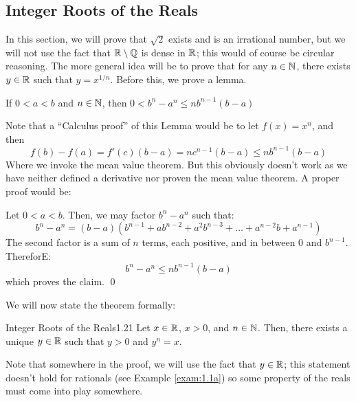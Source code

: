 \subsection{Integer Roots of the Reals}
In this section, we will prove that $\sqrt{2}$ exists and is an irrational number, but we will not use the fact that $\mathbb{R} \setminus \mathbb{Q}$ is dense in $\mathbb{R}$; this would of course be circular reasoning. The more general idea will be to prove that for any $n \in \mathbb{N}$, there exists $y \in \mathbb{R}$ such that $y = x^{1/n}$. Before this, we prove a lemma.
\begin{nlemma}{}
    If $0 < a < b$ and $n \in \mathbb{N}$, then $0 < b^n - a^n \leq nb^{n-1}(b-a)$
\end{nlemma}
\noindent Note that a ``Calculus proof'' of this Lemma would be to let $f(x) = x^n$, and then
\[f(b) - f(a) = f'(c)(b-a) = nc^{n-1}(b-a) \leq nb^{n-1}(b-a)\]
Where we invoke the mean value theorem. But this obviously doesn't work as we have neither defined a derivative nor proven the mean value theorem. A proper proof would be:
\begin{nproof}
    Let $0 < a < b$. Then, we may factor $b^n - a^n$ such that:
    \[b^n - a^n = (b-a)(b^{n-1} + ab^{n-2} + a^2b^{n-3} + \ldots + a^{n-2}b + a^{n-1})\]
    The second factor is a sum of $n$ terms, each positive, and in between $0$ and $b^{n-1}$. ThereforE:
    \[b^n - a^n \leq nb^{n-1}(b-a)\]
    which proves the claim. \qed
\end{nproof}
\noindent We will now state the theorem formally:
\begin{theorem}{Integer Roots of the Reals}{1.21}
    Let $x \in \mathbb{R}$, $x > 0$, and $n \in \mathbb{N}$. Then, there exists a unique $y \in \mathbb{R}$ such that $y > 0$ and $y^n = x$. 
\end{theorem}
\noindent Note that somewhere in the proof, we will use the fact that $y \in \mathbb{R}$; this statement doesn't hold for rationals (see Example \ref{exam:1.1a}) so some property of the reals must come into play somewhere.
